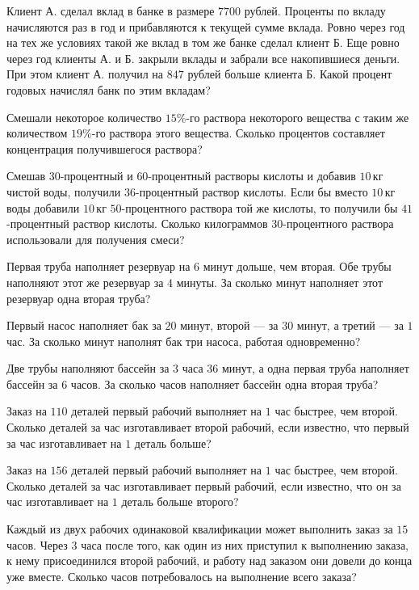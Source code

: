 \begin{class}[number=6]
	\begin{listofex}
		\item Клиент А. сделал вклад в банке в размере \( 7700  \) рублей. Проценты по вкладу начисляются раз в год и прибавляются к текущей сумме вклада. Ровно через год на тех же условиях такой же вклад в том же банке сделал клиент Б. Еще ровно через год клиенты А. и Б. закрыли вклады и забрали все накопившиеся деньги. При этом клиент А. получил на \( 847  \) рублей больше клиента Б. Какой процент годовых начислял банк по этим вкладам?
		\item Смешали некоторое количество \( 15\% \)-го раствора некоторого вещества с таким же количеством \( 19\% \)-го раствора этого вещества. Сколько процентов составляет концентрация получившегося раствора?
		\item Смешав \( 30 \)-процентный и \( 60 \)-процентный растворы кислоты и добавив \( 10 \) кг чистой воды, получили \( 36 \)-процентный раствор кислоты. Если бы вместо \( 10 \) кг воды добавили \( 10 \) кг \( 50 \)-процентного раствора той же кислоты, то получили бы \( 41 \)-процентный раствор кислоты. Сколько килограммов \( 30 \)-процентного раствора использовали для получения смеси?
		\item Первая труба наполняет резервуар на \( 6 \) минут дольше, чем вторая. Обе трубы наполняют этот же резервуар за \( 4  \) минуты. За сколько минут наполняет этот резервуар одна вторая труба?
		\item Первый насос наполняет бак за \( 20  \) минут, второй --- за \( 30 \) минут, а третий --- за \( 1  \) час. За сколько минут наполнят бак три насоса, работая одновременно?
		\item Две трубы наполняют бассейн за \( 3 \) часа \( 36 \) минут, а одна первая труба наполняет бассейн за \( 6 \) часов. За сколько часов наполняет бассейн одна вторая труба?
		\item Заказ на \( 110 \) деталей первый рабочий выполняет на \( 1 \) час быстрее, чем второй. Сколько деталей за час изготавливает второй рабочий, если известно, что первый за час изготавливает на \( 1 \) деталь больше?
		\item Заказ на \( 156 \) деталей первый рабочий выполняет на \( 1 \) час быстрее, чем второй. Сколько деталей за час изготавливает первый рабочий, если известно, что он за час изготавливает на \( 1 \) деталь больше второго?
		\item Каждый из двух рабочих одинаковой квалификации может выполнить заказ за \( 15 \) часов. Через \( 3 \) часа после того, как один из них приступил к выполнению заказа, к нему присоединился второй рабочий, и работу над заказом они довели до конца уже вместе. Сколько часов потребовалось на выполнение всего заказа?

\end{listofex}
\end{class}
